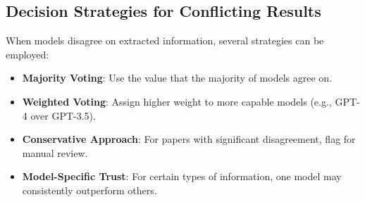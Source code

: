 \subsection{Decision Strategies for Conflicting Results}

When models disagree on extracted information, several strategies can be employed:

\begin{itemize}
    \item \textbf{Majority Voting}: Use the value that the majority of models agree on.
    \item \textbf{Weighted Voting}: Assign higher weight to more capable models (e.g., GPT-4 over GPT-3.5).
    \item \textbf{Conservative Approach}: For papers with significant disagreement, flag for manual review.
    \item \textbf{Model-Specific Trust}: For certain types of information, one model may consistently outperform others.
\end{itemize}

